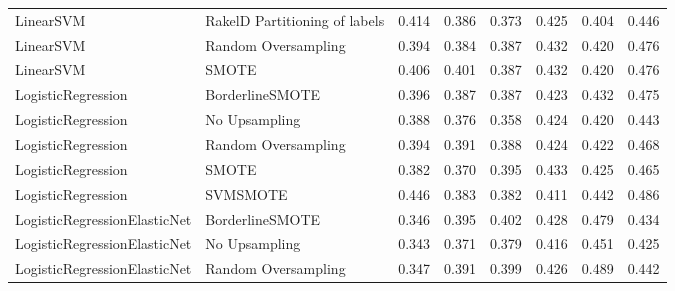 \begin{tabular}{llllllll}
                      LinearSVM & RakelD Partitioning of labels & 0.414 &                     0.386 &                 0.373 &                  0.425 &                                   0.404 &     0.446 \\
                      LinearSVM &           Random Oversampling & 0.394 &                     0.384 &                 0.387 &                  0.432 &                                   0.420 &     0.476 \\
                      LinearSVM &                         SMOTE & 0.406 &                     0.401 &                 0.387 &                  0.432 &                                   0.420 &     0.476 \\
             LogisticRegression &               BorderlineSMOTE & 0.396 &                     0.387 &                 0.387 &                  0.423 &                                   0.432 &     0.475 \\
             LogisticRegression &                 No Upsampling & 0.388 &                     0.376 &                 0.358 &                  0.424 &                                   0.420 &     0.443 \\
             LogisticRegression &           Random Oversampling & 0.394 &                     0.391 &                 0.388 &                  0.424 &                                   0.422 &     0.468 \\
             LogisticRegression &                         SMOTE & 0.382 &                     0.370 &                 0.395 &                  0.433 &                                   0.425 &     0.465 \\
             LogisticRegression &                      SVMSMOTE & 0.446 &                     0.383 &                 0.382 &                  0.411 &                                   0.442 &     0.486 \\
   LogisticRegressionElasticNet &               BorderlineSMOTE & 0.346 &                     0.395 &                 0.402 &                  0.428 &                                   0.479 &     0.434 \\
   LogisticRegressionElasticNet &                 No Upsampling & 0.343 &                     0.371 &                 0.379 &                  0.416 &                                   0.451 &     0.425 \\
   LogisticRegressionElasticNet &           Random Oversampling & 0.347 &                     0.391 &                 0.399 &                  0.426 &                                   0.489 &     0.442 \\

\end{tabular}
